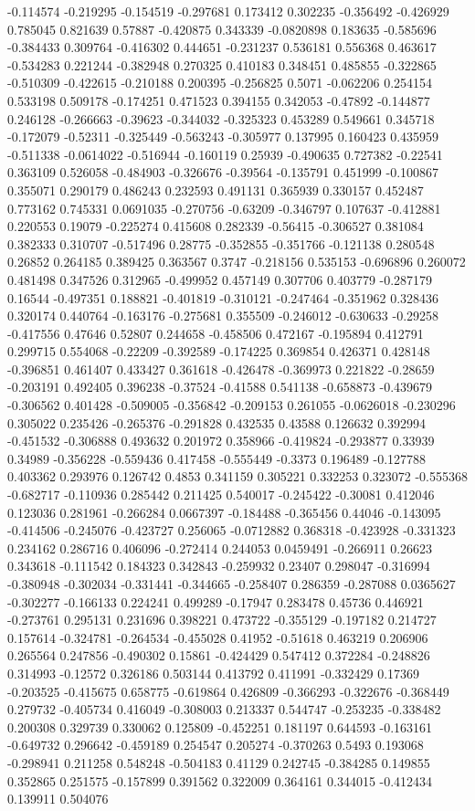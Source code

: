 -0.114574 -0.219295 -0.154519 -0.297681 0.173412 0.302235 -0.356492 -0.426929 0.785045 0.821639 0.57887 -0.420875 0.343339 -0.0820898 0.183635 -0.585696 -0.384433 0.309764 -0.416302 0.444651 -0.231237 0.536181 0.556368 0.463617 -0.534283 0.221244 -0.382948 0.270325 0.410183 0.348451 0.485855 -0.322865 -0.510309 -0.422615 -0.210188 0.200395 -0.256825 0.5071 -0.062206 0.254154 0.533198 0.509178 -0.174251 0.471523 0.394155 0.342053 -0.47892 -0.144877 0.246128 -0.266663 -0.39623 -0.344032 -0.325323 0.453289 0.549661 0.345718 -0.172079 -0.52311 -0.325449 -0.563243 -0.305977 0.137995 0.160423 0.435959 -0.511338 -0.0614022 -0.516944 -0.160119 0.25939 -0.490635 0.727382 -0.22541 0.363109 0.526058 -0.484903 -0.326676 -0.39564 -0.135791 0.451999 -0.100867 0.355071 0.290179 0.486243 0.232593 0.491131 0.365939 0.330157 0.452487 0.773162 0.745331 0.0691035 -0.270756 -0.63209 -0.346797 0.107637 -0.412881 0.220553 0.19079 -0.225274 0.415608 0.282339 -0.56415 -0.306527 0.381084 0.382333 0.310707 -0.517496 0.28775 -0.352855 -0.351766 -0.121138 0.280548 0.26852 0.264185 0.389425 0.363567 0.3747 -0.218156 0.535153 -0.696896 0.260072 0.481498 0.347526 0.312965 -0.499952 0.457149 0.307706 0.403779 -0.287179 0.16544 -0.497351 0.188821 -0.401819 -0.310121 -0.247464 -0.351962 0.328436 0.320174 0.440764 -0.163176 -0.275681 0.355509 -0.246012 -0.630633 -0.29258 -0.417556 0.47646 0.52807 0.244658 -0.458506 0.472167 -0.195894 0.412791 0.299715 0.554068 -0.22209 -0.392589 -0.174225 0.369854 0.426371 0.428148 -0.396851 0.461407 0.433427 0.361618 -0.426478 -0.369973 0.221822 -0.28659 -0.203191 0.492405 0.396238 -0.37524 -0.41588 0.541138 -0.658873 -0.439679 -0.306562 0.401428 -0.509005 -0.356842 -0.209153 0.261055 -0.0626018 -0.230296 0.305022 0.235426 -0.265376 -0.291828 0.432535 0.43588 0.126632 0.392994 -0.451532 -0.306888 0.493632 0.201972 0.358966 -0.419824 -0.293877 0.33939 0.34989 -0.356228 -0.559436 0.417458 -0.555449 -0.3373 0.196489 -0.127788 0.403362 0.293976 0.126742 0.4853 0.341159 0.305221 0.332253 0.323072 -0.555368 -0.682717 -0.110936 0.285442 0.211425 0.540017 -0.245422 -0.30081 0.412046 0.123036 0.281961 -0.266284 0.0667397 -0.184488 -0.365456 0.44046 -0.143095 -0.414506 -0.245076 -0.423727 0.256065 -0.0712882 0.368318 -0.423928 -0.331323 0.234162 0.286716 0.406096 -0.272414 0.244053 0.0459491 -0.266911 0.26623 0.343618 -0.111542 0.184323 0.342843 -0.259932 0.23407 0.298047 -0.316994 -0.380948 -0.302034 -0.331441 -0.344665 -0.258407 0.286359 -0.287088 0.0365627 -0.302277 -0.166133 0.224241 0.499289 -0.17947 0.283478 0.45736 0.446921 -0.273761 0.295131 0.231696 0.398221 0.473722 -0.355129 -0.197182 0.214727 0.157614 -0.324781 -0.264534 -0.455028 0.41952 -0.51618 0.463219 0.206906 0.265564 0.247856 -0.490302 0.15861 -0.424429 0.547412 0.372284 -0.248826 0.314993 -0.12572 0.326186 0.503144 0.413792 0.411991 -0.332429 0.17369 -0.203525 -0.415675 0.658775 -0.619864 0.426809 -0.366293 -0.322676 -0.368449 0.279732 -0.405734 0.416049 -0.308003 0.213337 0.544747 -0.253235 -0.338482 0.200308 0.329739 0.330062 0.125809 -0.452251 0.181197 0.644593 -0.163161 -0.649732 0.296642 -0.459189 0.254547 0.205274 -0.370263 0.5493 0.193068 -0.298941 0.211258 0.548248 -0.504183 0.41129 0.242745 -0.384285 0.149855 0.352865 0.251575 -0.157899 0.391562 0.322009 0.364161 0.344015 -0.412434 0.139911 0.504076 